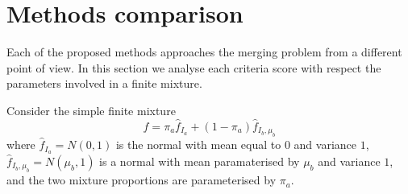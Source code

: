 \documentclass[10pt, a4paper]{article}
\begin{document}
%
%
%




\section{Methods comparison}

Each of the proposed methods approaches the merging problem from a different point of view. In this section we analyse each criteria score with respect the parameters involved in a finite mixture. 


Consider the simple finite mixture
\begin{equation}\label{two_mixture}
f = \pi_a \hat{f}_{I_a} + (1 - \pi_a) \hat{f}_{I_b, \mu_b}
\end{equation}
where $\hat{f}_{I_a} = N(0, 1)$ is the normal with mean equal to $0$ and variance $1$, $\hat{f}_{I_b, \mu_b} = N(\mu_b, 1)$ is a normal with mean paramaterised by $\mu_b$ and variance $1$, and the two mixture proportions are parameterised by $\pi_a$. 
\end{document}
